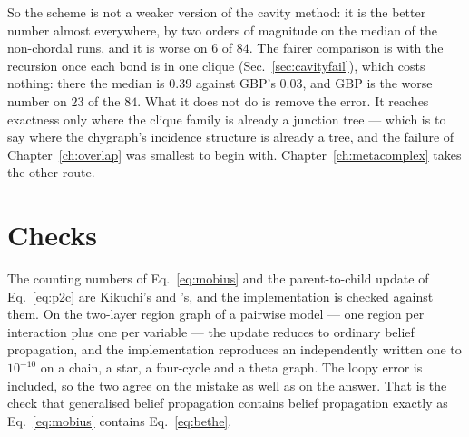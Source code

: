 So the scheme is not a weaker version of the cavity method: it is the better
number almost everywhere, by two orders of magnitude on the median of the
non-chordal runs, and it is worse on $6$ of $84$. The fairer comparison is
with the recursion once each bond is in one clique
(Sec.~\ref{sec:cavityfail}), which costs nothing: there the median is $0.39$
against GBP's $0.03$, and GBP is the worse number on $23$ of the $84$. What
it does not do is
remove the error. It reaches exactness only where the clique family is already a
junction tree --- which is to say where the chygraph's incidence structure is
already a tree, and the failure of Chapter~\ref{ch:overlap} was smallest to
begin with. Chapter~\ref{ch:metacomplex} takes the other route.

\section{Checks}
\label{sec:gbp-checks}

The counting numbers of Eq.~\eqref{eq:mobius} and the parent-to-child update of
Eq.~\eqref{eq:p2c} are Kikuchi's and \citeauthor{yedidia2005}'s, and the
implementation is checked against them. On the two-layer region graph of a
pairwise model --- one region per interaction plus one per variable --- the
update reduces to ordinary belief propagation, and the implementation reproduces
an independently written one to $10^{-10}$ on a chain, a star, a four-cycle and
a theta graph. The loopy error is included, so the two agree on the mistake as
well as on the answer. That is the check that generalised belief propagation
contains belief propagation exactly as Eq.~\eqref{eq:mobius} contains
Eq.~\eqref{eq:bethe}.

